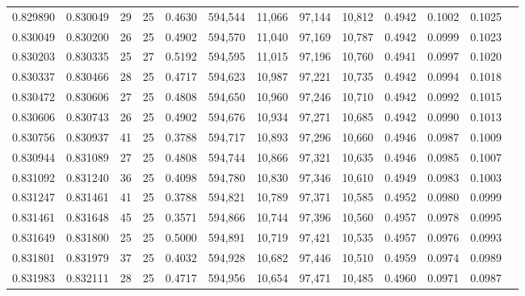 \begin{tabular}{rrrrrrrrrrrrr}
0.829890 & 0.830049 &    29 &  25 &                                     0.4630 & 594,544 &  11,066 &  97,144 &  10,812 & 0.4942 & 0.1002 & 0.1025 \\
0.830049 & 0.830200 &    26 &  25 &                                     0.4902 & 594,570 &  11,040 &  97,169 &  10,787 & 0.4942 & 0.0999 & 0.1023 \\
0.830203 & 0.830335 &    25 &  27 &                                     0.5192 & 594,595 &  11,015 &  97,196 &  10,760 & 0.4941 & 0.0997 & 0.1020 \\
0.830337 & 0.830466 &    28 &  25 &                                     0.4717 & 594,623 &  10,987 &  97,221 &  10,735 & 0.4942 & 0.0994 & 0.1018 \\
0.830472 & 0.830606 &    27 &  25 &                                     0.4808 & 594,650 &  10,960 &  97,246 &  10,710 & 0.4942 & 0.0992 & 0.1015 \\
0.830606 & 0.830743 &    26 &  25 &                                     0.4902 & 594,676 &  10,934 &  97,271 &  10,685 & 0.4942 & 0.0990 & 0.1013 \\
0.830756 & 0.830937 &    41 &  25 &                                     0.3788 & 594,717 &  10,893 &  97,296 &  10,660 & 0.4946 & 0.0987 & 0.1009 \\
0.830944 & 0.831089 &    27 &  25 &                                     0.4808 & 594,744 &  10,866 &  97,321 &  10,635 & 0.4946 & 0.0985 & 0.1007 \\
0.831092 & 0.831240 &    36 &  25 &                                     0.4098 & 594,780 &  10,830 &  97,346 &  10,610 & 0.4949 & 0.0983 & 0.1003 \\
0.831247 & 0.831461 &    41 &  25 &                                     0.3788 & 594,821 &  10,789 &  97,371 &  10,585 & 0.4952 & 0.0980 & 0.0999 \\
0.831461 & 0.831648 &    45 &  25 &                                     0.3571 & 594,866 &  10,744 &  97,396 &  10,560 & 0.4957 & 0.0978 & 0.0995 \\
0.831649 & 0.831800 &    25 &  25 &                                     0.5000 & 594,891 &  10,719 &  97,421 &  10,535 & 0.4957 & 0.0976 & 0.0993 \\
0.831801 & 0.831979 &    37 &  25 &                                     0.4032 & 594,928 &  10,682 &  97,446 &  10,510 & 0.4959 & 0.0974 & 0.0989 \\
0.831983 & 0.832111 &    28 &  25 &                                     0.4717 & 594,956 &  10,654 &  97,471 &  10,485 & 0.4960 & 0.0971 & 0.0987 \\

\end{tabular}
